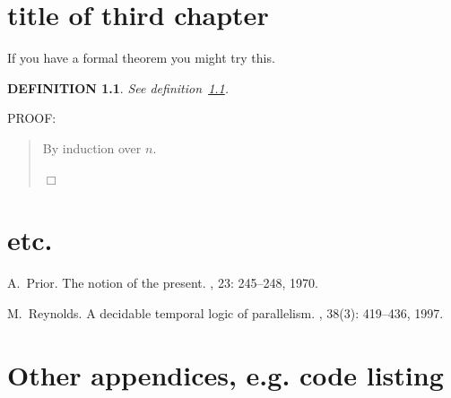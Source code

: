 \documentclass[12pt]{report}
\newtheorem{definition}[theorem]{DEFINITION}
\newenvironment{proof}{
PROOF:
\begin{quotation}}{
$\Box$ \end{quotation}}
\begin{document}
\chapter{title of third chapter}
If you have a formal theorem you might try this.
\begin{definition}\label{def}
See definition~\ref{def}.
\end{definition}
\begin{proof}
By induction over $n$.
\end{proof}

\chapter{etc.}
\appendix


\begin{thebibliography}{HHM99}


A.~Prior.
\newblock The notion of the present.
, 23:  245--248, 1970.


M.~Reynolds.
\newblock A decidable temporal logic of parallelism.
, 38(3):  419--436,
  1997.
\end{thebibliography}
\chapter{Other appendices, e.g. code listing}
\end{document}
